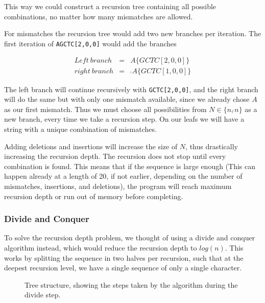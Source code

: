 \documentclass[12pt]{article}
\begin{document}
This way we could construct a recursion tree containing all possible combinations, no matter how many mismatches are allowed.

For mismatches the recursion tree would add two new branches per iteration. The first iteration of \texttt{AGCTC[2,0,0]} would add the branches

\begin{eqnarray}
	Left\ branch &=& A\{GCTC[2,0,0]\} \\
	right\ branch &=&\ \hat{}A\{GCTC[1,0,0]\}
\end{eqnarray}

The left branch will continue recursively with \texttt{GCTC[2,0,0]}, and the right branch will do the same but with only one mismatch available, since we already chose $A$ as our first mismatch. Thus we must choose all possibilities from $N \in \{n, \hat{}n\}$ as a new branch, every time we take a recursion step.
On our leafs we will have a string with a unique combination of mismatches.

Adding deletions and insertions will increase the size of $N$, thus drastically increasing the recursion depth. The recursion does not stop until every combination is found. This means that if the sequence is large enough (This can happen already at a length of 20, if not earlier, depending on the number of mismatches, insertions, and deletions), the program will reach maximum recursion depth or run out of memory before completing.

\subsubsection{Divide and Conquer}

To solve the recursion depth problem, we thought of using a divide and conquer algorithm instead, which would reduce the recursion depth to $log(n)$. This works by splitting the sequence in two halves per recursion, such that at the deepest recursion level, we have a single sequence of only a single character. 

\begin{figure}[H]
	\centering
	\caption{Tree structure, showing the steps taken by the algorithm during the divide step.}
	\label{fig:tree_example}
\end{figure}
\end{document}
